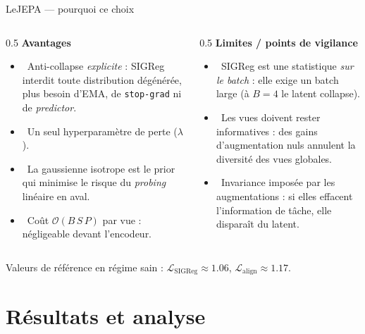 \documentclass[aspectratio=169]{beamer}
\newcommand{\cmark}{\textcolor{green!50!black}{\ding{51}}}
\newcommand{\xmark}{\textcolor{red!70!black}{\ding{55}}}
\newcommand{\Lloss}{\mathcal{L}}
\begin{document}
\begin{frame}{LeJEPA --- pourquoi ce choix}
  \begin{columns}[T]
    \begin{column}{0.5\textwidth}
      \textbf{Avantages}
      \begin{itemize}
        \item \cmark\ Anti-collapse \emph{explicite} : SIGReg interdit toute distribution dégénérée,
              plus besoin d'EMA, de \texttt{stop-grad} ni de \emph{predictor}.
        \item \cmark\ Un seul hyperparamètre de perte ($\lambda$).
        \item \cmark\ La gaussienne isotrope est le prior qui minimise le risque du \emph{probing}
              linéaire en aval.
        \item \cmark\ Coût $\mathcal{O}(B\,S\,P)$ par vue : négligeable devant l'encodeur.
      \end{itemize}
    \end{column}
    \begin{column}{0.5\textwidth}
      \textbf{Limites / points de vigilance}
      \begin{itemize}
        \item \xmark\ SIGReg est une statistique \emph{sur le batch} : elle exige un batch large
              (à $B=4$ le latent collapse).
        \item \xmark\ Les vues doivent rester informatives : des gains d'augmentation nuls
              annulent la diversité des vues globales.
        \item \xmark\ Invariance imposée par les augmentations : si elles effacent
              l'information de tâche, elle disparaît du latent.
      \end{itemize}
    \end{column}
  \end{columns}

  \vspace{0.2cm}
  {\footnotesize Valeurs de référence en régime sain : $\Lloss_{\text{SIGReg}} \approx 1.06$,
  $\Lloss_{\text{align}} \approx 1.17$.}
\end{frame}

\section{Résultats et analyse}
\end{document}
